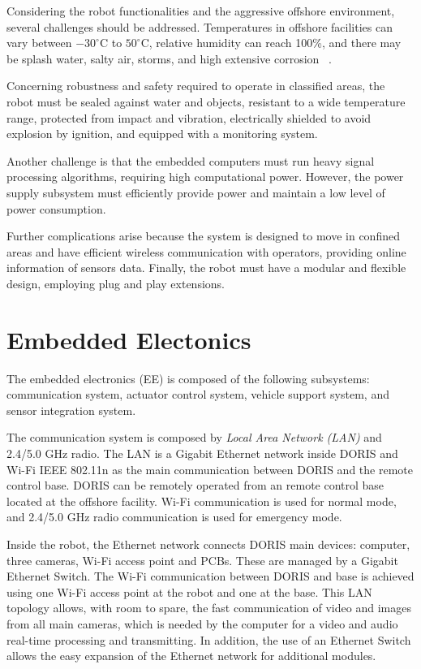 \documentclass{ifacconf}
\begin{document}
Considering the robot functionalities and the aggressive offshore environment,
several challenges should be addressed. Temperatures in offshore facilities can
vary between $-30^{\circ}$C to $50^{\circ}$C, relative humidity can reach
100\%, and there may be splash water, salty air, storms, and high extensive
corrosion ~\cite{graf2007mobile}. 

Concerning robustness and safety required to operate in classified areas, the
robot must be sealed against water and objects, resistant to a wide temperature
range, protected from impact and vibration, electrically shielded to avoid
explosion by ignition, and equipped with a monitoring system.


Another challenge is that the embedded computers must run heavy signal
processing algorithms, requiring high computational power. However, the power
supply subsystem must efficiently provide power and maintain a low level of
power consumption.

Further complications arise because the system is designed to move in confined
areas and have efficient wireless communication with operators, providing
online information of sensors data. Finally, the robot must have a modular and
flexible design, employing plug and play extensions.


\section{Embedded Electonics}\label{sec:electronics_overview}
The embedded electronics (EE) is composed of the following subsystems:
communication system, actuator control system, vehicle support system, and
sensor integration system. 

The communication system is composed by \emph{Local Area Network (LAN)} and
2.4/5.0 GHz radio. 
\newline
The LAN is a Gigabit Ethernet network inside DORIS and Wi-Fi IEEE
802.11n as the main communication between DORIS and the remote control base.
DORIS can be remotely operated from an remote control base located at the
offshore facility. Wi-Fi communication is used for normal mode, and 2.4/5.0 GHz
radio communication is used for emergency mode.

Inside the robot, the Ethernet network connects DORIS main devices: computer,
three cameras, Wi-Fi access point and PCBs. These are managed by a Gigabit
Ethernet Switch. The Wi-Fi communication between DORIS and base is achieved
using one Wi-Fi access point at the robot and one at the base. This LAN
topology allows, with room to spare, the fast communication of video and images
from all main cameras, which is needed by the computer for a video and
audio real-time processing and transmitting. In addition, the use of an Ethernet
Switch allows the easy expansion of the Ethernet network for additional modules.
\end{document}
